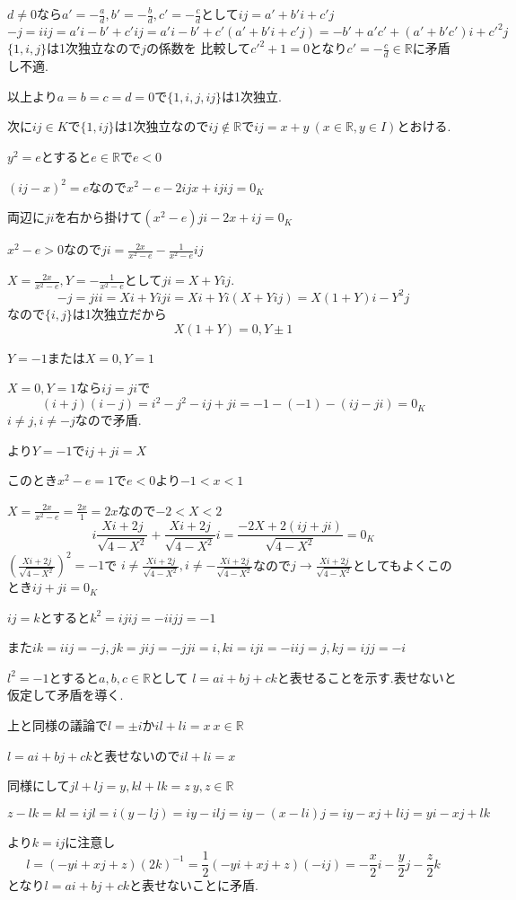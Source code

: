 \documentclass{jsarticle}
\begin{document}
$d\neq 0$なら$a'=-\frac{a}{d},b'=-\frac{b}{d},c'=-\frac{c}{d}$として$ij=a'+b'i+c'j$
\[-j=iij=a'i-b'+c'ij
=a'i-b'+c'(a'+b'i+c'j)=-b'+a'c'+(a'+b'c')i+c'^2j
\]
$\{1,i,j\}$は1次独立なので$j$の係数を
比較して$c'^2+1=0$となり$c'=-\frac{c}{d}\in\mathbb{R}$に矛盾し不適.

以上より$a=b=c=d=0$で$\{1,i,j,ij\}$は1次独立.

次に$ij\in K$で$\{1,ij\}$は1次独立なので$ij\notin\mathbb{R}$で$ij=x+y \ (x\in\mathbb{R},y\in I)$とおける.

$y^2=e$とすると$e\in\mathbb{R}$で$e<0$

$(ij-x)^2=e$なので$x^2 -e - 2ijx+ijij=0_K$

両辺に$ji$を右から掛けて$(x^2-e)ji-2x+ij=0_K$

$x^2-e > 0$なので$ji=\frac{2x}{x^2-e}-\frac{1}{x^2-e}ij$

$X=\frac{2x}{x^2-e},Y=-\frac{1}{x^2-e}$として$ji=X+Yij$.
\[-j=jii=Xi+Yiji=Xi+Yi(X+Yij)=X(1+Y)i-Y^2j\]
なので$\{i,j\}$は1次独立だから
\[X(1+Y)=0,Y\pm 1\]

$Y=-1$または$X=0,Y=1$

$X=0,Y=1$なら$ij=ji$で
\[(i+j)(i-j)= i^2-j^2-ij+ji=-1-(-1)-(ij-ji)=0_K\]
$i\neq j,i\neq -j$なので矛盾.

より$Y=-1$で$ij+ji=X$

このとき$x^2-e=1$で$e<0$より$-1<x<1$

$X=\frac{2x}{x^2-e}=\frac{2x}{1}=2x$なので$-2<X<2$
\[i\frac{Xi+2j}{\sqrt{4-X^2}}+\frac{Xi+2j}{\sqrt{4-X^2}}i=\frac{-2X+2(ij+ji)}{\sqrt{4-X^2}}=0_K\]
$(\frac{Xi+2j}{\sqrt{4-X^2}})^2=-1$で
$i\neq \frac{Xi+2j}{\sqrt{4-X^2}},i\neq -\frac{Xi+2j}{\sqrt{4-X^2}}$なので$j\rightarrow \frac{Xi+2j}{\sqrt{4-X^2}}$としてもよくこのとき$ij+ji=0_K$

$ij=k$とすると$k^2=ijij=-iijj=-1$

また$ik=iij=-j,jk=jij=-jji=i,ki=iji=-iij=j,kj=ijj=-i$

$l^2=-1$とすると$a,b,c\in\mathbb{R}$として
$l=ai+bj+ck$と表せることを示す.表せないと仮定して矛盾を導く.

上と同様の議論で$l=\pm i$か$il+li=x \ x\in\mathbb{R}$

$l=ai+bj+ck$と表せないので$il+li=x$

同様にして$jl+lj=y,kl+lk=z \ y,z\in\mathbb{R}$

\[z-lk=kl=ijl=i(y-lj)=iy-ilj=iy-(x-li)j=iy-xj+lij=yi-xj+lk\]

より$k=ij$に注意し
\[l=(-yi+xj+z)(2k)^{-1}=\frac{1}{2}(-yi+xj+z)(-ij)=
-\frac{x}{2}i-\frac{y}{2}j-\frac{z}{2}k\]
となり$l=ai+bj+ck$と表せないことに矛盾.
\end{document}
